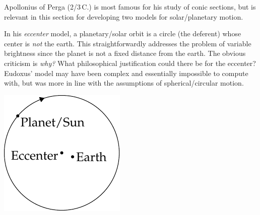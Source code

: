 \begin{minipage}[t]{0.74\linewidth}\vspace{0pt}
	 Apollonius of Perga (2\nd/3\rd{}\,C.\BC) is most famous for his study of conic sections, but is relevant in this section for developing two models for solar/planetary motion.\smallbreak
	
	In his \emph{eccenter} model, a planetary/solar orbit is a circle (the deferent) whose center is \emph{not} the earth. This straightforwardly addresses the problem of variable brightness since the planet is not a fixed distance from the earth.\smallbreak
	    The obvious criticism is \emph{why?} What philosophical justification could there be for the eccenter? Eudoxus' model may have been complex and essentially impossible to compute with, but was more in line with the assumptions of spherical/circular motion.
\end{minipage}
\hfill
\begin{minipage}[t]{0.25\linewidth}\vspace{0pt}
  \flushright\includegraphics[scale=0.95]{trig-deferent}\phantom{b}
\end{minipage}
\medbreak
  

